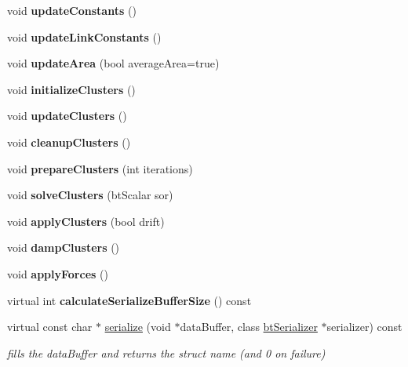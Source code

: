 \begin{DoxyCompactItemize}
\mbox{\label{classbtSoftBody_ad73c943fe892bd5e3242e65de5df3db1}} 
void {\bfseries update\+Constants} ()
\item 
\mbox{\label{classbtSoftBody_ad92f5a4896bbce5574d8ddee53ed448b}} 
void {\bfseries update\+Link\+Constants} ()
\item 
\mbox{\label{classbtSoftBody_a4b8bec593f187ae54ca4a2cd1bab7863}} 
void {\bfseries update\+Area} (bool average\+Area=true)
\item 
\mbox{\label{classbtSoftBody_ac6bcd9853756ab196ea18c831a04a8b7}} 
void {\bfseries initialize\+Clusters} ()
\item 
\mbox{\label{classbtSoftBody_a0fbc8cbbe127ff3d1ed9467e709a8181}} 
void {\bfseries update\+Clusters} ()
\item 
\mbox{\label{classbtSoftBody_a6b9b7057950305e0046f173fe27698da}} 
void {\bfseries cleanup\+Clusters} ()
\item 
\mbox{\label{classbtSoftBody_a4ee4c96c4821c31be91a3edeab2365fd}} 
void {\bfseries prepare\+Clusters} (int iterations)
\item 
\mbox{\label{classbtSoftBody_aa577be31d76bdc85298424d88790e6d5}} 
void {\bfseries solve\+Clusters} (bt\+Scalar sor)
\item 
\mbox{\label{classbtSoftBody_a47c6e2066250a6c2564abadf3fc72029}} 
void {\bfseries apply\+Clusters} (bool drift)
\item 
\mbox{\label{classbtSoftBody_a83d01c7ffe27a02f42bcb9d191c4a327}} 
void {\bfseries damp\+Clusters} ()
\item 
\mbox{\label{classbtSoftBody_ab60ff6213c14fe1f6c7a354503dadc80}} 
void {\bfseries apply\+Forces} ()
\item 
\mbox{\label{classbtSoftBody_aa6ec4f140fc45d7d3dcdf98c82d6c898}} 
virtual int {\bfseries calculate\+Serialize\+Buffer\+Size} () const
\item 
\mbox{\label{classbtSoftBody_a54d6f189021eef581f81ba72c37fbad6}} 
virtual const char $\ast$ \hyperlink{classbtSoftBody_a54d6f189021eef581f81ba72c37fbad6}{serialize} (void $\ast$data\+Buffer, class \hyperlink{classbtSerializer}{bt\+Serializer} $\ast$serializer) const
\begin{DoxyCompactList}\small\item\em fills the data\+Buffer and returns the struct name (and 0 on failure) \end{DoxyCompactList}\end{DoxyCompactItemize}
